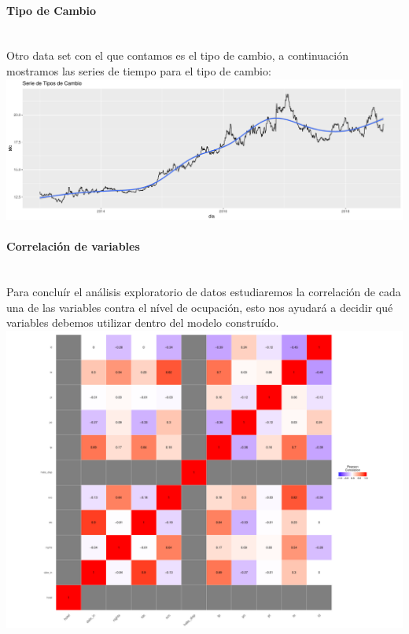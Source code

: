 \documentclass{article}\usepackage[]{graphicx}\usepackage[]{color}
\makeatletter
\def\maxwidth{ %
  \ifdim\Gin@nat@width>\linewidth
    \linewidth
  \else
    \Gin@nat@width
  \fi
}
\newenvironment{knitrout}{}{} %
\makeatother
\begin{document}
\paragraph{Tipo de Cambio}~\\
Otro data set con el que contamos es el tipo de cambio, a continuación mostramos las series de tiempo para el tipo de cambio:
~\\
\begin{knitrout}
\color{fgcolor}
\includegraphics[width=\maxwidth]{figures/TiposdeCambio-1} 

\end{knitrout}
\paragraph{Correlación de variables}~\\
Para concluír el análisis exploratorio de datos estudiaremos la correlación de cada una de las variables contra el nível de ocupación, esto nos ayudará a decidir qué variables debemos utilizar dentro del modelo construído.
~\\
\begin{knitrout}
\color{fgcolor}
\includegraphics[width=\maxwidth]{figures/Correlacion-1} 

\end{knitrout}
~\\
\end{document}
